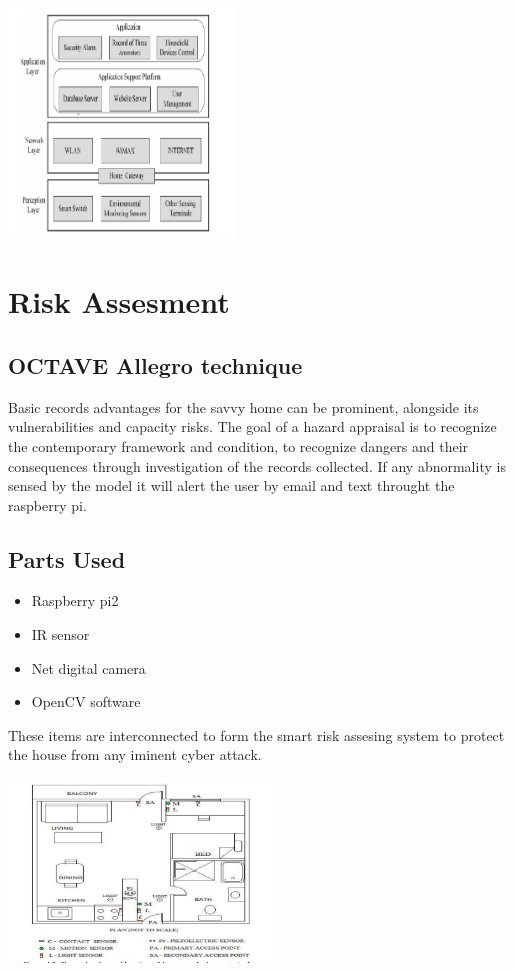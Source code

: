 \documentclass{article}
\begin{document}
\begin{center}
\includegraphics[width=6cm]{Architechture.png}
\end{center}

\section{Risk Assesment}
\subsection{OCTAVE Allegro technique}
Basic records
advantages for the savvy home can be prominent, alongside
its vulnerabilities and capacity risks.
The goal of a
hazard appraisal is to recognize the contemporary framework
and condition, to recognize dangers and their consequences
through investigation of the records collected.
If any abnormality is sensed by the model it will alert the user by email and text throught the raspberry pi.
\subsection{Parts Used}
\begin{itemize}
    \item Raspberry pi2
    \item IR sensor
    \item Net digital camera
    \item OpenCV software
\end{itemize}
These items are interconnected to form the smart risk assesing system to protect the house from any iminent cyber attack.
\begin{center}
\includegraphics[width=7cm]{Sensor Deployment.png}
\end{center}
\end{document}

